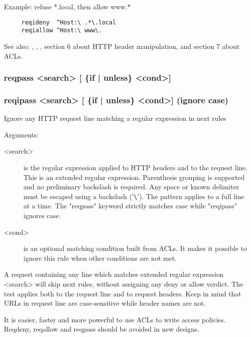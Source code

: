   Example: refuse *.local, then allow www.*
  
\begin{verbatim}
     reqideny  ^Host:\ .*\.local
     reqiallow ^Host:\ www\.
\end{verbatim}

  See also: , , , section 6 about HTTP header
            manipulation, and section 7 about ACLs.

\subsubsection[reqpass]{reqpass  <search> [ \{if | unless\} <cond>] }
\subsubsection[reqipass]{reqipass <search> [ \{if | unless\} <cond>]  (ignore case) }


  Ignore any HTTP request line matching a regular expression in next rules


  Arguments:
  \begin{description}
  \item[<search>] is the regular expression applied to HTTP headers and to the
              request line. This is an extended regular expression. Parenthesis
              grouping is supported and no preliminary backslash is required.
              Any space or known delimiter must be escaped using a backslash
              ('\verb|\|'). The pattern applies to a full line at a time. The
              "reqpass" keyword strictly matches case while "reqipass" ignores
              case.

  \item[<cond>] is an optional matching condition built from ACLs. It makes it
              possible to ignore this rule when other conditions are not met.
  \end{description}

  A request containing any line which matches extended regular expression
  <search> will skip next rules, without assigning any deny or allow verdict.
  The test applies both to the request line and to request headers. Keep in
  mind that URLs in request line are case-sensitive while header names are not.

  It is easier, faster and more powerful to use ACLs to write access policies.
  Reqdeny, reqallow and reqpass should be avoided in new designs.

